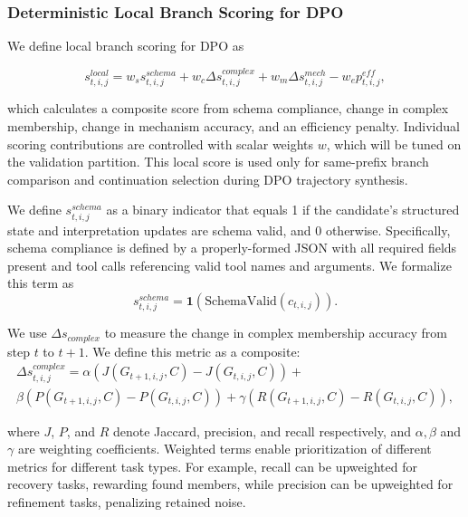 \documentclass[thesis,letterpaper,12pt]{utthesis}
\begin{document}
\subsubsection{Deterministic Local Branch Scoring for DPO}
We define local branch scoring for DPO as 

\begin{equation}\label{eqn:local-reward}
    s^{local}_{t,i,j} = w_{s} s^{schema}_{t,i,j} + w_c \Delta s^{complex}_{t,i,j} + w_m \Delta s^{mech}_{t,i,j} - w_e p^{eff}_{t,i,j},
\end{equation}

which calculates a composite score from schema compliance, change in complex membership, change in mechanism accuracy, and an efficiency penalty. Individual scoring contributions are controlled with scalar weights $w$, which will be tuned on the validation partition. This local score is used only for same-prefix branch comparison and continuation selection during DPO trajectory synthesis.

We define $s^{schema}_{t,i,j}$ as a binary indicator that equals 1 if the candidate's structured state and interpretation updates are schema valid, and 0 otherwise. Specifically, schema compliance is defined by a properly-formed JSON with all required fields present and tool calls referencing valid tool names and arguments. We formalize this term as
\begin{equation}\label{eqn:schema-score}
   s^{schema}_{t,i,j} = \mathbf{1}(\text{SchemaValid}(c_{t,i,j})).
\end{equation}

We use $\Delta s_{complex}$ to measure the change in complex membership accuracy from step $t$ to $t+1$. We define this metric as a composite:
\begin{multline}\label{eqn:complex-score}
    \Delta s^{complex}_{t,i,j} = \alpha(J(G_{t+1,i,j}, C) - J(G_{t,i,j}, C)) + \\ \beta (P(G_{t+1,i,j}, C) - P(G_{t,i,j}, C)) + \gamma (R(G_{t+1,i,j}, C) - R(G_{t,i,j}, C)),
\end{multline}

where $J$, $P$, and $R$ denote Jaccard, precision, and recall respectively, and $\alpha, \beta$ and $\gamma$ are weighting coefficients. Weighted terms enable prioritization of different metrics for different task types. For example, recall can be upweighted for recovery tasks, rewarding found members, while precision can be upweighted for refinement tasks, penalizing retained noise.
\end{document}
